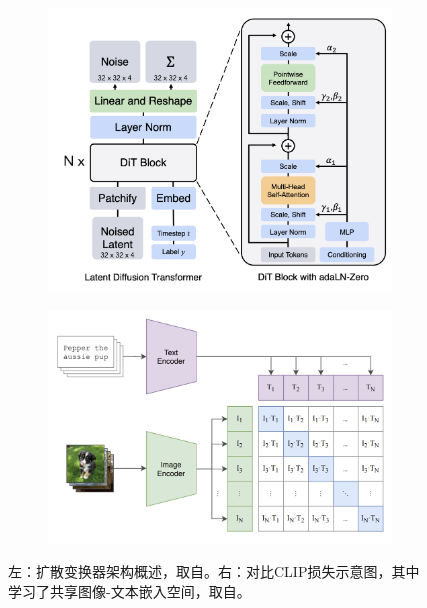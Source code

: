 \begin{figure}[!t]
\centering
\begin{subfigure}{.5\textwidth}
  \centering
  \includegraphics[width=0.95\linewidth]{figures/dit.png}
  \label{fig:sub1}
\end{subfigure}%
\begin{subfigure}{.5\textwidth}
  \centering
  \includegraphics[width=0.95\linewidth]{figures/clip.png}
  \label{fig:sub2}
\end{subfigure}
\caption{左：扩散变换器架构概述，取自\cite{dit}。右：对比CLIP损失示意图，其中学习了共享图像-文本嵌入空间，取自\cite{clip}。}
\label{fig:test}
\end{figure}

